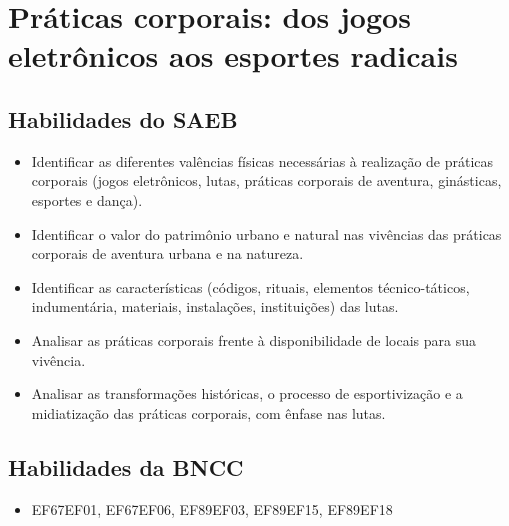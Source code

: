 \chapter{Práticas corporais: dos jogos eletrônicos aos esportes radicais}


\section*{Habilidades do SAEB}

\begin{itemize}
\item
  Identificar as diferentes valências físicas necessárias
  à realização de práticas corporais (jogos eletrônicos, lutas, práticas
  corporais de aventura, ginásticas, esportes e dança).
\item
  Identificar o valor do patrimônio urbano e natural nas vivências das
  práticas corporais de aventura urbana e na natureza.
\item
  Identificar as características (códigos, rituais, elementos
  técnico-táticos, indumentária, materiais, instalações, instituições)
  das lutas.
\item
  Analisar as práticas corporais frente à disponibilidade de locais para
  sua vivência.
\item
  Analisar as transformações históricas, o processo de esportivização e
  a midiatização das práticas corporais, com ênfase nas lutas.
\end{itemize}

\section*{Habilidades da BNCC}

\begin{itemize}
  \item
EF67EF01, EF67EF06, EF89EF03, EF89EF15, EF89EF18
\end{itemize}


